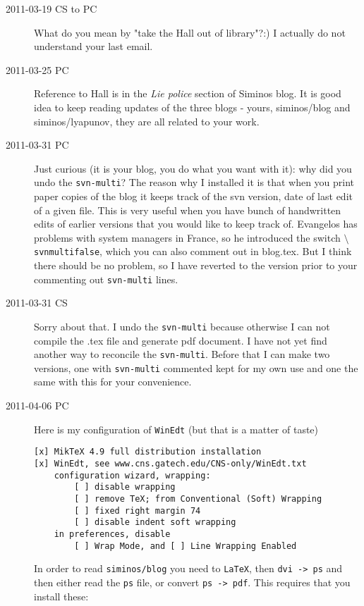 \begin{description}
\item[2011-03-19 CS to PC]
What do you mean by "take the Hall out of library"?:) I actually do not
understand your last email.

\item[2011-03-25 PC]
Reference to Hall is in the {\em Lie police} section of Siminos
blog. It is good idea to keep reading updates of the three blogs - yours,
siminos/blog and siminos/lyapunov, they are all related to your work.

\item[2011-03-31 PC] Just curious (it is your blog, you do what you want with it):
    why did you undo the \texttt{svn-multi}? The reason why I installed
    it is that when you print paper copies of the blog it keeps track of
    the svn version, date of last edit of a given file. This is very
    useful when you have bunch of handwritten edits of earlier versions
    that you would like to keep track of. Evangelos has problems with
    system managers in France, so he introduced the switch
    \texttt{$\setminus$svnmultifalse}, which you can also comment out in
    blog.tex. But I think there should be no problem, so I have reverted
    to the version prior to your commenting out \texttt{svn-multi} lines.

\item[2011-03-31 CS] Sorry about that. I undo the \texttt{svn-multi}
because otherwise I can not compile the .tex file and generate pdf
document. I have not yet find another way to reconcile the
\texttt{svn-multi}. Before that I can make two versions, one with
\texttt{svn-multi} commented kept for my own use and one the same with
this for your convenience.

\item[2011-04-06 PC] Here is my configuration of \texttt{WinEdt}
(but that is a matter of taste)

\begin{verbatim}
[x] MikTeX 4.9 full distribution installation
[x] WinEdt, see www.cns.gatech.edu/CNS-only/WinEdt.txt
	configuration wizard, wrapping:
        [ ] disable wrapping
		[ ] remove TeX; from Conventional (Soft) Wrapping
		[ ] fixed right margin 74
		[ ] disable indent soft wrapping
	in preferences, disable
		[ ] Wrap Mode, and [ ] Line Wrapping Enabled
\end{verbatim}

In order to read \texttt{siminos/blog} you need to \texttt{LaTeX},
then \texttt{dvi -> ps} and then either read the \texttt{ps} file, or
convert \texttt{ps -> pdf}. This requires that you install these:


\end{description}
